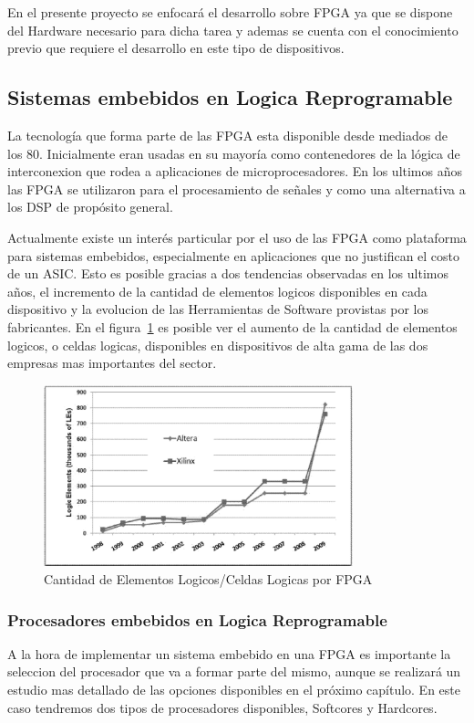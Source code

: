 En el presente proyecto se enfocará el desarrollo sobre FPGA ya que se dispone del Hardware necesario para dicha tarea y ademas se cuenta con el conocimiento previo que requiere el desarrollo en este tipo de dispositivos.
 

\subsection{Sistemas embebidos en Logica Reprogramable}

La tecnología que forma parte de las FPGA esta disponible desde mediados de los 80. Inicialmente eran usadas en su mayoría como contenedores de la lógica de interconexion que rodea a aplicaciones de microprocesadores. 
En los ultimos años las FPGA se utilizaron para el procesamiento de señales y como una alternativa a los DSP de propósito general.

Actualmente existe un interés particular por el uso de las FPGA como plataforma para sistemas embebidos, especialmente en aplicaciones que no justifican el costo de un ASIC. Esto es posible gracias a dos tendencias observadas en los ultimos años, el incremento de la cantidad de elementos logicos disponibles en cada dispositivo y la evolucion de las Herramientas de Software provistas por los fabricantes. En el figura~\ref{figa:elementoslogicos} es posible ver el aumento de la cantidad de elementos logicos, o celdas logicas, disponibles en dispositivos de alta gama de las dos empresas mas importantes del sector.

\begin{figure}[ht]
  \centering
	\includegraphics[width=0.80\textwidth]{2-sistema/graf/legrow.eps}
  \caption{Cantidad de Elementos Logicos/Celdas Logicas por FPGA}
  \label{figa:elementoslogicos}
\end{figure}

\newpage
\subsubsection{Procesadores embebidos en Logica Reprogramable}
A la hora de implementar un sistema embebido en una FPGA es importante la seleccion del procesador que va a formar parte del mismo, aunque se realizará un estudio mas detallado de las opciones disponibles en el próximo capítulo. En este caso tendremos dos tipos de procesadores disponibles, Softcores y Hardcores. 

